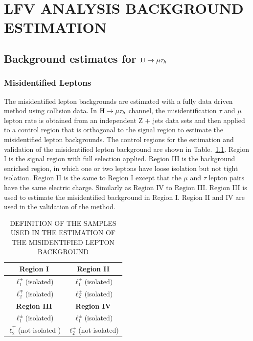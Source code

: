 \chapter{LFV ANALYSIS BACKGROUND ESTIMATION}

\section{Background estimates for $\mathrm{H}\to \mu\tau_{h}$}

\subsection{Misidentified Leptons}

The misidentified lepton backgrounds are estimated with a fully data driven method using collision data. In $\mathrm{H}\to \mu\tau_{h}$ channel, the misidentification $\tau$ and $\mu$ lepton rate is obtained from an independent Z + jets data sets and then applied to a control region that is orthogonal to the signal region to estimate the misidentified lepton backgrounds.  The control regions for the estimation and validation of the misidentified lepton background are shown in Table.~\ref{tab:fakeratediagram}. Region I is the signal region with full selection applied. Region III is the background enriched region, in which one or two leptons have loose isolation but not tight isolation. Region II is the same to Region I except that the $\mu$ and $\tau$ lepton pairs have the same electric charge. Similarly as Region IV to Region III. Region III is used to estimate the misidentified background in Region I. Region II and IV are used in the validation of the method. 


\begin{table}[hbt!]
 \centering
 {
 \renewcommand{\arraystretch}{1.1}
 \caption{DEFINITION OF THE SAMPLES USED IN THE ESTIMATION OF THE MISIDENTIFIED LEPTON BACKGROUND}
  \label{tab:fakeratediagram}
  \begin{tabular}{c|c} \hline
\textbf{Region I}              &  \textbf{Region II}             \\ \hline
$\ell^{\pm}_{1}$(isolated)  &  $\ell^{\pm}_{1}$(isolated)             \\
$\ell^{\mp}_{2}$(isolated)  &  $\ell^{\pm}_{2}$(isolated)             \\

\hline \hline
\textbf{Region III}           &  \textbf{Region IV}             \\ \hline
$\ell^{\pm}_{1}$(isolated)  &  $\ell^{\pm}_{1}$(isolated)             \\
$\ell^{\mp}_{2}$(not-isolated )  &  $\ell^{\pm}_{2}$(not-isolated)             \\
\hline
  \end{tabular}
}
\end{table}



